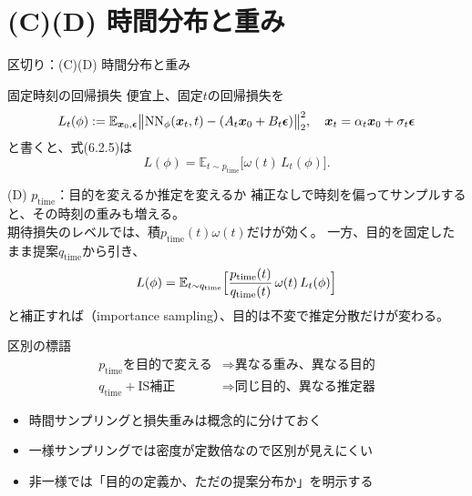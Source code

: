 \section{(C)(D) 時間分布と重み}
\asmain
\begin{frame}{区切り：(C)(D) 時間分布と重み}
    \tableofcontents[currentsection]
\end{frame}
\asmain
\begin{frame}{固定時刻の回帰損失}
    便宜上、固定$t$の回帰損失を
    \[
        L_t(\phi)
        :=
        \mathbb{E}_{\bm{x}_0,\bm{\epsilon}}
        \bigl\|
        \mathrm{NN}_\phi(\bm{x}_t,t)
        -
        (A_t\bm{x}_0+B_t\bm{\epsilon})
        \bigr\|_{2}^{2},
        \quad
        \bm{x}_t=\alpha_t\bm{x}_0+\sigma_t\bm{\epsilon}
    \]
    と書くと、式(6.2.5)は
    \[
        L(\phi)
        =
        \mathbb{E}_{t\sim p_{\mathrm{time}}}
        \bigl[\omega(t)\,L_t(\phi)\bigr].
    \]
\end{frame}
\asmain
\begin{frame}{(D) $p_{\mathrm{time}}$：目的を変えるか推定を変えるか}
    補正なしで時刻を偏ってサンプルすると、その時刻の重みも増える。\\
    期待損失のレベルでは、積$p_{\mathrm{time}}(t)\omega(t)$だけが効く。
    \vspace{0.4em}
    一方、目的を固定したまま提案$q_{\mathrm{time}}$から引き、
    \[
        L(\phi)
        =
        \mathbb{E}_{t\sim q_{\mathrm{time}}}
        \Bigl[
        \frac{p_{\mathrm{time}}(t)}{q_{\mathrm{time}}(t)}\,
        \omega(t)\,L_t(\phi)
        \Bigr]
    \]
    と補正すれば（importance sampling）、目的は不変で推定分散だけが変わる。
\end{frame}
\asmain
\begin{frame}{区別の標語}
    \[
        \begin{aligned}
        p_{\mathrm{time}}\text{を目的で変える}
        &\Longrightarrow
        \text{異なる重み、異なる目的}
        \\
        q_{\mathrm{time}}+\text{IS補正}
        &\Longrightarrow
        \text{同じ目的、異なる推定器}
        \end{aligned}
    \]
    \begin{itemize}
        \item 時間サンプリングと損失重みは概念的に分けておく
        \item 一様サンプリングでは密度が定数倍なので区別が見えにくい
        \item 非一様では「目的の定義か、ただの提案分布か」を明示する
    \end{itemize}
\end{frame}
